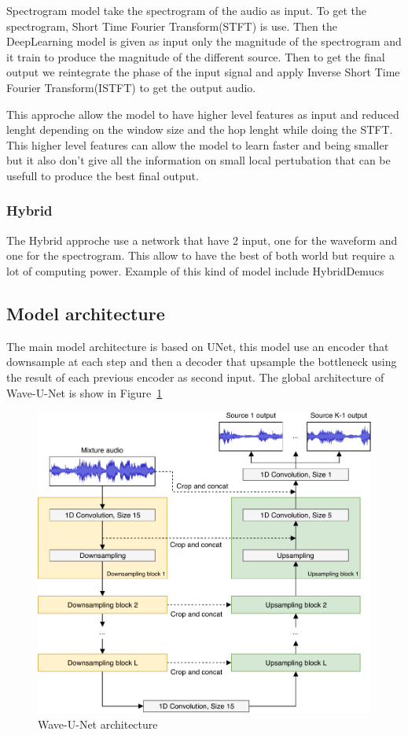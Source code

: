 \documentclass[final]{cvpr}
\begin{document}
Spectrogram model take the spectrogram of the audio as input.
To get the spectrogram, Short Time Fourier Transform(STFT) is use.
Then the DeepLearning model is given as input only the magnitude of the spectrogram and it train to produce the magnitude of the different source.
Then to get the final output we reintegrate the phase of the input signal and apply Inverse Short Time Fourier Transform(ISTFT) to get the output audio.

This approche allow the model to have higher level features as input and reduced lenght depending on the window size and the hop lenght while doing the STFT.
This higher level features can allow the model to learn faster and being smaller but it also don't give all the information on small local pertubation that can be usefull to produce the best final output.



\subsubsection{Hybrid}
The Hybrid approche use a network that have 2 input, one for the waveform and one for the spectrogram.
This allow to have the best of both world but require a lot of computing power. Example of this kind of model include HybridDemucs \cite{hybrid-demucs}

\subsection{Model architecture}

The main model architecture is based on UNet, this model use an encoder that downsample at each step and then a decoder that upsample the bottleneck using the result of each previous encoder as second input.
The global architecture of Wave-U-Net\cite{waveunet} is show in Figure~\ref{waveunet-architecture}

\begin{figure}
   \includegraphics[scale=0.25]{waveunet.png}
   \caption{Wave-U-Net architecture}
   \label{waveunet-architecture}
\end{figure}
\end{document}
